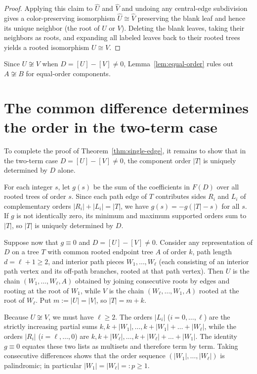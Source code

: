 \documentclass[10pt]{article}
\begin{document}
\begin{proof}
Applying this claim to $\widehat{U}$ and $\widehat{V}$ and undoing any central-edge subdivision gives a color-preserving isomorphism $\widehat{U}\cong \widehat{V}$ preserving the blank leaf and hence its unique neighbor (the root of $U$ or $V$). Deleting the blank leaves, taking their neighbors as roots, and expanding all labeled leaves back to their rooted trees yields a rooted isomorphism $U\cong V$.
\end{proof}

Since $U\not\cong V$ when $D=[U]-[V]\neq 0$, Lemma~\ref{lem:equal-order} rules out $A\not\cong B$ for equal-order components.

\section{The common difference determines the order in the two-term case}

To complete the proof of Theorem~\ref{thm:single-edge}, it remains to show that in the two-term case $D=[U]-[V]\neq 0$, the component order $|T|$ is uniquely determined by $D$ alone.

For each integer $s$, let $g(s)$ be the sum of the coefficients in $F(D)$ over all rooted trees of order $s$. Since each path edge of $T$ contributes sides $R_i$ and $L_i$ of complementary orders $|R_i|+|L_i|=|T|$, we have $g(s)=-g(|T|-s)$ for all $s$. If $g$ is not identically zero, its minimum and maximum supported orders sum to $|T|$, so $|T|$ is uniquely determined by $D$.

Suppose now that $g\equiv 0$ and $D=[U]-[V]\neq 0$. Consider any representation of $D$ on a tree $T$ with common rooted endpoint tree $A$ of order $k$, path length $d=\ell+1\ge 2$, and interior path pieces $W_1,\ldots,W_\ell$ (each consisting of an interior path vertex and its off-path branches, rooted at that path vertex). Then $U$ is the chain $(W_1,\ldots,W_\ell,A)$ obtained by joining consecutive roots by edges and rooting at the root of $W_1$, while $V$ is the chain $(W_\ell,\ldots,W_1,A)$ rooted at the root of $W_\ell$. Put $m := |U| = |V|$, so $|T| = m+k$.

Because $U\not\cong V$, we must have $\ell\ge 2$. The orders $|L_i|$ ($i=0,\ldots,\ell$) are the strictly increasing partial sums $k, k+|W_1|, \ldots, k+|W_1|+\dots+|W_\ell|$, while the orders $|R_i|$ ($i=\ell,\ldots,0$) are $k, k+|W_\ell|, \ldots, k+|W_\ell|+\dots+|W_1|$. The identity $g\equiv 0$ equates these two lists as multisets and therefore term by term. Taking consecutive differences shows that the order sequence $(|W_1|,\ldots,|W_\ell|)$ is palindromic; in particular $|W_1|=|W_\ell|=:p\ge 1$.
\end{document}
